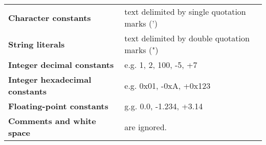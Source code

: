 {%
\vspace{1cm}

\begin{tabular}{ll}
\textbf{Character constants}            & text delimited by single quotation marks (') \\
\textbf{String literals}                & text delimited by double quotation marks (") \\
\textbf{Integer decimal constants}      & e.g. 1, 2, 100, -5, +7                       \\
\textbf{Integer hexadecimal constants}  & e.g. 0x01, -0xA, +0x123                      \\
\textbf{Floating-point constants}       & g.g. 0.0, -1.234, +3.14                      \\
\textbf{Comments and white space}       & are ignored.                                 \\
\end{tabular}
}
